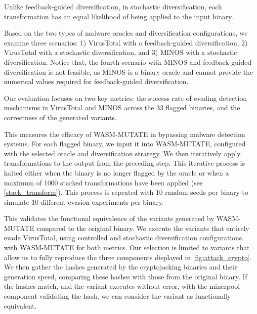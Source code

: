 \begin{definition}
    \label{uncontrolled_def}
    Unlike feedback-guided diversification, in stochastic diversification, each transformation has an equal likelihood of being applied to the input \Wasm binary.
\end{definition}


Based on the two types of malware oracles and diversification configurations, we examine three scenarios:
1) VirusTotal with a feedback-guided diversification, 2) VirusTotal with a stochastic diversification, and 3) MINOS with a stochastic diversification.
Notice that, the fourth scenario with MINOS and feedback-guided diversification is not feasible, as MINOS is a binary oracle and cannot provide the numerical values required for feedback-guided diversification.

Our evaluation focuses on two key metrics: the success rate of evading detection mechanisms in VirusTotal and MINOS across the 33 flagged binaries, and the correctness of the generated variants.

\begin{definition} This measures the efficacy of WASM-MUTATE in bypassing malware detection systems. 
    For each flagged binary, we input it into WASM-MUTATE, configured with the selected oracle and diversification strategy. 
    We then iteratively apply transformations to the output from the preceding step. 
    This iterative process is halted either when the binary is no longer flagged by the oracle or when a maximum of 1000 stacked transformations have been applied (see \autoref{stack_transform}).
    This process is repeated with 10 random seeds per binary to simulate 10 different evasion experiments per binary.
\end{definition}

\begin{definition}[Correctness] This validates the functional equivalence of the variants generated by WASM-MUTATE compared to the original binary. 
    We execute the variants that entirely evade VirusTotal, using controlled and stochastic diversification configurations with WASM-MUTATE for both metrics. 
    Our selection is limited to variants that allow us to fully reproduce the three components displayed in \autoref{fig:attack_crypto}. 
    We then gather the hashes generated by the cryptojacking binaries and their generation speed, comparing these hashes with those from the original binary. 
    If the hashes match, and the variant executes without error, with the minerpool component validating the hash, we can consider the variant as functionally equivalent.
\end{definition}

